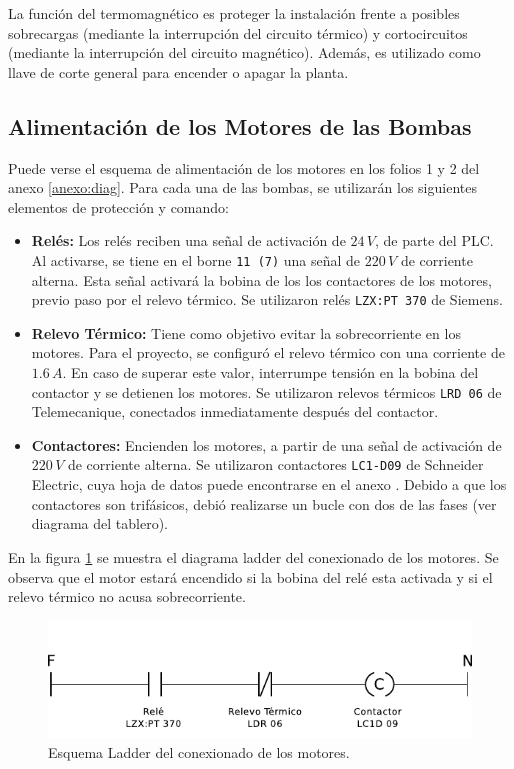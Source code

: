 La función del termomagnético es proteger la instalación frente a posibles
sobrecargas (mediante la interrupción del circuito térmico) y cortocircuitos
(mediante la interrupción del circuito magnético).
Además, es utilizado como llave de corte general para encender o apagar la
planta.

\subsection{Alimentación de los Motores de las Bombas}
\label{subsec:alimentacionMotores}
Puede verse el esquema de alimentación de los motores en los folios 1 y 2 del
anexo \ref{anexo:diag}.
Para cada una de las bombas, se utilizarán los siguientes elementos de
protección y comando:
\begin{itemize}
 \item \textbf{Relés:}
 Los relés reciben una señal de activación de $24\,V$, de parte del PLC.
 Al activarse, se tiene en el borne \verb|11 (7)| una señal de $220\,V$
de corriente alterna.
Esta señal activará la bobina de los los contactores de los motores, previo paso
por el relevo térmico. Se utilizaron relés \verb|LZX:PT 370| de Siemens.
 \item \textbf{Relevo Térmico:}
 Tiene como objetivo evitar la sobrecorriente en los motores.
 Para el proyecto, se configuró el relevo térmico con una corriente
 de $1.6\,A$.
 En caso de superar este valor, interrumpe tensión en la bobina
 del contactor y se detienen los motores.
 Se utilizaron relevos térmicos \verb|LRD 06| de Telemecanique, conectados
inmediatamente después del contactor.
 \item \textbf{Contactores:}
 Encienden los motores, a partir de una señal de activación de $220\,V$ de
corriente alterna.
Se utilizaron contactores \verb|LC1-D09| de Schneider Electric, cuya hoja de
datos puede encontrarse en el anexo .
Debido a que los contactores son trifásicos, debió realizarse un bucle con dos
de las fases (ver diagrama del tablero).
\end{itemize}

En la figura \ref{fig:diagramaLadderContactor} se muestra el diagrama ladder
del conexionado de los motores.
Se observa que  el motor estará encendido si la bobina del relé esta activada y
si el relevo térmico no acusa sobrecorriente.

\begin{figure}
 \centering
 \includegraphics[scale=1.1]{Cap3-TableroElectrico/Images/ladderConexion.pdf}
 \caption{Esquema Ladder del conexionado de los motores.}
 \label{fig:diagramaLadderContactor}
\end{figure}


